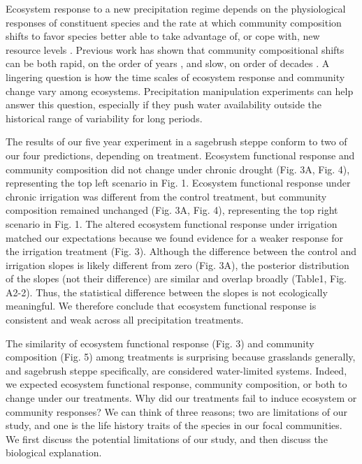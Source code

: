 \documentclass[fleqn,10pt,lineno]{wlpeerj} %
\begin{document}
Ecosystem response to a new precipitation regime depends on the
physiological responses of constituent species and the rate at which
community composition shifts to favor species better able to take
advantage of, or cope with, new resource levels \citep{Smith2009}.
Previous work has shown that community compositional shifts can be both
rapid, on the order of years \citep{Hoover2014}, and slow, on order of
decades \citep{Knapp2012, Wilcox2016}. A lingering question is how the
time scales of ecosystem response and community change vary among
ecosystems. Precipitation manipulation experiments can help answer this
question, especially if they push water availability outside the
historical range of variability for long periods.

The results of our five year experiment in a sagebrush steppe conform to
two of our four predictions, depending on treatment. Ecosystem
functional response and community composition did not change under
chronic drought (Fig. 3A, Fig. 4), representing the top left scenario in
Fig. 1. Ecosystem functional response under chronic irrigation was
different from the control treatment, but community composition remained
unchanged (Fig. 3A, Fig. 4), representing the top right scenario in Fig.
1. The altered ecosystem functional response under irrigation matched
our expectations because we found evidence for a weaker response for the
irrigation treatment (Fig. 3). Although the difference between the
control and irrigation slopes is likely different from zero (Fig. 3A),
the posterior distribution of the slopes (not their difference) are
similar and overlap broadly (Table1, Fig. A2-2). Thus, the statistical
difference between the slopes is not ecologically meaningful. We
therefore conclude that ecosystem functional response is consistent and
weak across all precipitation treatments.

The similarity of ecosystem functional response (Fig. 3) and community
composition (Fig. 5) among treatments is surprising because grasslands
generally, and sagebrush steppe specifically, are considered
water-limited systems. Indeed, we expected ecosystem functional
response, community composition, or both to change under our treatments.
Why did our treatments fail to induce ecosystem or community responses?
We can think of three reasons; two are limitations of our study, and one
is the life history traits of the species in our focal communities. We
first discuss the potential limitations of our study, and then discuss
the biological explanation.
\end{document}
